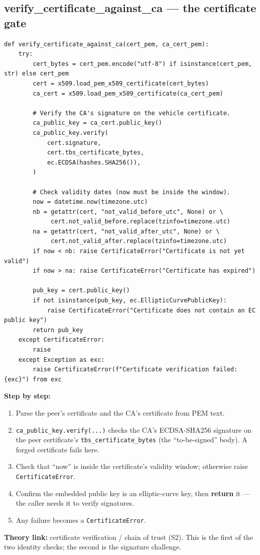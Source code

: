 \documentclass[11pt,a4paper]{report}
\begin{document}
\subsection{verify\_certificate\_against\_ca --- the certificate gate}
\begin{lstlisting}[style=py,caption={auth\_protocol.py --- verify a peer certificate against the trusted CA.}]
def verify_certificate_against_ca(cert_pem, ca_cert_pem):
    try:
        cert_bytes = cert_pem.encode("utf-8") if isinstance(cert_pem, str) else cert_pem
        cert = x509.load_pem_x509_certificate(cert_bytes)
        ca_cert = x509.load_pem_x509_certificate(ca_cert_pem)

        # Verify the CA's signature on the vehicle certificate.
        ca_public_key = ca_cert.public_key()
        ca_public_key.verify(
            cert.signature,
            cert.tbs_certificate_bytes,
            ec.ECDSA(hashes.SHA256()),
        )

        # Check validity dates (now must be inside the window).
        now = datetime.now(timezone.utc)
        nb = getattr(cert, "not_valid_before_utc", None) or \
             cert.not_valid_before.replace(tzinfo=timezone.utc)
        na = getattr(cert, "not_valid_after_utc", None) or \
             cert.not_valid_after.replace(tzinfo=timezone.utc)
        if now < nb: raise CertificateError("Certificate is not yet valid")
        if now > na: raise CertificateError("Certificate has expired")

        pub_key = cert.public_key()
        if not isinstance(pub_key, ec.EllipticCurvePublicKey):
            raise CertificateError("Certificate does not contain an EC public key")
        return pub_key
    except CertificateError:
        raise
    except Exception as exc:
        raise CertificateError(f"Certificate verification failed: {exc}") from exc
\end{lstlisting}
\textbf{Step by step:}
\begin{enumerate}
  \item Parse the peer's certificate and the CA's certificate from PEM text.
  \item \texttt{ca\_public\_key.verify(...)} checks the CA's ECDSA-SHA256
        signature on the peer certificate's \texttt{tbs\_certificate\_bytes}
        (the ``to-be-signed'' body). A forged certificate fails here.
  \item Check that ``now'' is inside the certificate's validity window;
        otherwise raise \texttt{CertificateError}.
  \item Confirm the embedded public key is an elliptic-curve key, then
        \textbf{return} it --- the caller needs it to verify signatures.
  \item Any failure becomes a \texttt{CertificateError}.
\end{enumerate}
\textbf{Theory link:} certificate verification / chain of trust (S2). This is the
first of the two identity checks; the second is the signature challenge.
\end{document}
